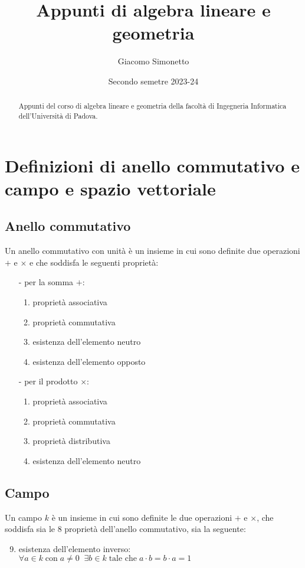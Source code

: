 \documentclass[a4paper]{article}
\title{Appunti di algebra lineare e geometria}
\author{Giacomo Simonetto}
\date{Secondo semetre 2023-24}
\begin{document}
\maketitle
\begin{abstract}
	Appunti del corso di algebra lineare e geometria della facoltà di Ingegneria Informatica dell'Università di Padova.
\end{abstract}

\newpage

\tableofcontents

\newpage

\section{Definizioni  di anello commutativo e campo e spazio vettoriale}
\subsection{Anello commutativo}
Un anello commutativo con unità è un insieme in cui sono definite due operazioni \(+\) e \(\times\) e che soddisfa le seguenti
proprietà:
\begin{itemize}
	\item[-] per la somma \(+\):
	\begin{enumerate}
		\item proprietà associativa
		\item proprietà commutativa
		\item esistenza dell'elemento neutro
		\item esistenza dell'elemento opposto
	\end{enumerate}
	\item[-] per il prodotto \(\times\):
	\begin{enumerate}[resume]
		\item proprietà associativa
		\item proprietà commutativa
		\item proprietà distributiva
		\item esistenza dell'elemento neutro
	\end{enumerate}
\end{itemize}

\subsection{Campo}
Un campo \(k\) è un insieme in cui sono definite le due operazioni \(+\) e \(\times\), che soddisfa sia le 8 proprietà dell'anello
commutativo, sia la seguente:
\begin{enumerate}[topsep=3pt, itemsep=0pt] \setcounter{enumi}{8}
	\item esistenza dell'elemento inverso: \(\forall a \in k \; \text{con} \; a \neq 0 \;\; \exists b \in k \; \text{tale che} \; a \cdot b =  b \cdot a = 1\)
\end{enumerate}
\end{document}
